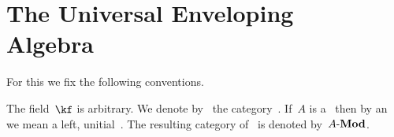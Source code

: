 \chapter[The Universal Enveloping Algebra]{The Universal Enveloping \texorpdfstring{\\}{} Algebra}
\label{universal enveloping algebra}


\begin{convention}
  For this  we fix the following conventions.
  
  The field~$\kf$ is arbitrary.
  We denote by~{\algebras{$\kf$}} the category~\algebras{$\kf$}.
  If~$A$ is a~{\algebra{$\kf$}} then by an~ we mean a left, unitial~{}.
  The resulting category of~{} is denoted by~$A\text{-}\mathbf{Mod}$.
\end{convention}

% 
%   
% 

